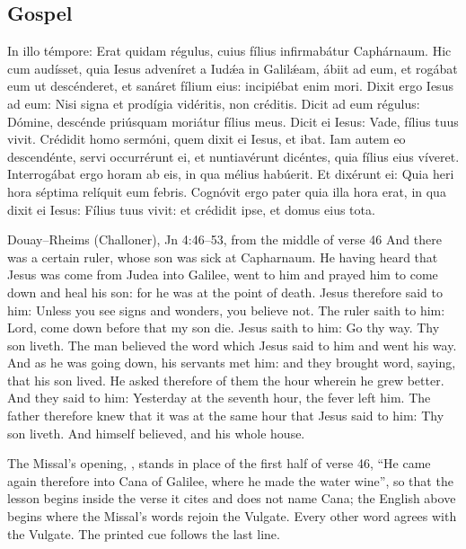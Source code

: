 \subsection{Gospel}
\label{proper-gospel}


\begin{latinproper}
In illo témpore: Erat quidam régulus, cuius fílius infirmabátur Caphárnaum.
Hic cum audísset, quia Iesus adveníret a Iudǽa in Galilǽam, ábiit ad eum, et
rogábat eum ut descénderet, et sanáret fílium eius: incipiébat enim mori.
Dixit ergo Iesus ad eum: Nisi signa et prodígia vidéritis, non créditis.
Dicit ad eum régulus: Dómine, descénde priúsquam moriátur fílius meus. Dicit
ei Iesus: Vade, fílius tuus vivit. Crédidit homo sermóni, quem dixit ei Iesus,
et ibat. Iam autem eo descendénte, servi occurrérunt ei, et nuntiavérunt
dicéntes, quia fílius eius víveret. Interrogábat ergo horam ab eis, in qua
mélius habúerit. Et dixérunt ei: Quia heri hora séptima relíquit eum febris.
Cognóvit ergo pater quia illa hora erat, in qua dixit ei Iesus: Fílius tuus
vivit: et crédidit ipse, et domus eius tota.
\end{latinproper}

\begin{englishwitness}{Douay--Rheims (Challoner), Jn 4:46--53, from the middle of verse 46}
And there was a certain ruler, whose son was sick at Capharnaum. He having heard
that Jesus was come from Judea into Galilee, went to him and prayed him to come
down and heal his son: for he was at the point of death. Jesus therefore said to
him: Unless you see signs and wonders, you believe not. The ruler saith to him:
Lord, come down before that my son die. Jesus saith to him: Go thy way. Thy son
liveth. The man believed the word which Jesus said to him and went his way. And
as he was going down, his servants met him: and they brought word, saying, that
his son lived. He asked therefore of them the hour wherein he grew better. And
they said to him: Yesterday at the seventh hour, the fever left him. The father
therefore knew that it was at the same hour that Jesus said to him: Thy son
liveth. And himself believed, and his whole house.
\end{englishwitness}

\noindent The Missal's opening, ,
stands in place of the first half of verse 46, ``He came again therefore into
Cana of Galilee, where he made the water wine'', so that the lesson begins
inside the verse it cites and does not name Cana; the English above begins
where the Missal's words rejoin the Vulgate. Every other word agrees with the
Vulgate. The printed cue  follows the last line.

